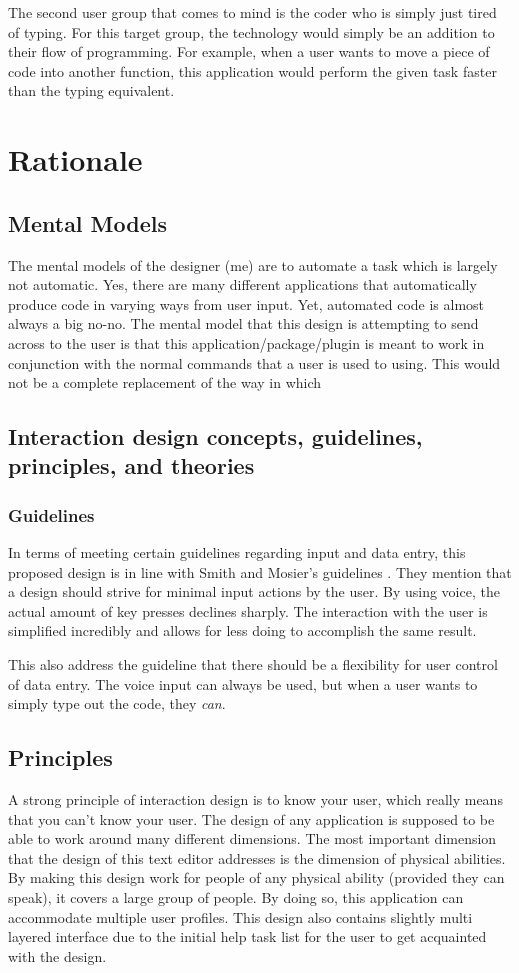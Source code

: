\documentclass[11pt, oneside]{article}
\begin{document}
The second user group that comes to mind is the coder who is simply just tired of typing. For this target group, the technology would simply be an addition to their flow of programming. For example, when a user wants to move a piece of code into another function, this application would perform the given task faster than the typing equivalent.


\section{Rationale}

\subsection{Mental Models}
The mental models of the designer (me) are to automate a task which is largely not automatic. Yes, there are many different applications that automatically produce code in varying ways from user input. Yet, automated code is almost always a big no-no. The mental model that this design is attempting to send across to the user is that this application/package/plugin is meant to work in conjunction with the normal commands that a user is used to using. This would not be a complete replacement of the way in which 

\subsection{Interaction design concepts, guidelines, principles, and theories}
\subsubsection{Guidelines}
In terms of meeting certain guidelines regarding input and data entry, this proposed design is in line with Smith and Mosier's guidelines \cite{guidelines}. They mention that a design should strive for minimal input actions by the user. By using voice, the actual amount of key presses declines sharply. The interaction with the user is simplified incredibly and allows for less doing to accomplish the same result.

This also address the guideline that there should be a flexibility for user control of data entry. The voice input can always be used, but when a user wants to simply type out the code, they \textit{can}.

\subsection{Principles}
A strong principle of interaction design is to know your user, which really means that you can't know your user. The design of any application is supposed to be able to work around many different dimensions. The most important dimension that the design of this text editor addresses is the dimension of physical abilities. By making this design work for people of any physical ability (provided they can speak), it covers a large group of people. By doing so, this application can accommodate multiple user profiles. This design also contains slightly multi layered interface due to the initial help task list for the user to get acquainted with the design.
\end{document}
